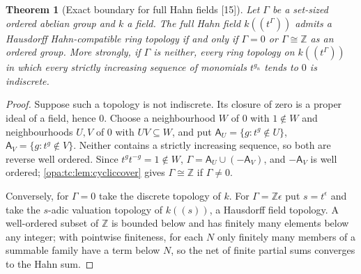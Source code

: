 \documentclass[11pt,oneside]{article}
\numberwithin{equation}{section}
\newtheorem{theorem}{Theorem}[section]
\theoremstyle{definition}
\theoremstyle{remark}
\newcommand{\Z}{\mathbb Z}
\newcommand{\Hahn}[2]{#1((t^{#2}))}
\newcommand{\src}[1]{\textup{\textsf{\small[#1]}}}
\begin{document}
\begin{theorem}[Exact boundary for full Hahn fields \src{15}]\label{opa:tc:thm:cyclicboundary}
Let $\Gamma$ be a set-sized ordered abelian group and $k$ a field. The full Hahn field $\Hahn k\Gamma$
admits a Hausdorff Hahn-compatible ring topology if and only if $\Gamma=0$ or $\Gamma\cong\Z$ as an ordered
group. More strongly, if $\Gamma$ is neither, every ring topology on $\Hahn k\Gamma$ in which every strictly
increasing sequence of monomials $t^{g_n}$ tends to $0$ is indiscrete.
\end{theorem}
\begin{proof}
Suppose such a topology is not indiscrete. Its closure of zero is a proper ideal of a field, hence
$0$. Choose a neighbourhood $W$ of $0$ with $1\notin W$ and neighbourhoods $U,V$ of $0$ with
$UV\subseteq W$, and put $\mathsf A_U=\{g:t^g\notin U\}$, $\mathsf A_V=\{g:t^g\notin V\}$. Neither
contains a strictly increasing sequence, so both are reverse well ordered. Since $t^gt^{-g}=1\notin W$,
$\Gamma=\mathsf A_U\cup(-\mathsf A_V)$, and $-\mathsf A_V$ is well ordered; \cref{opa:tc:lem:cycliccover}
gives $\Gamma\cong\Z$ if $\Gamma\ne0$.

Conversely, for $\Gamma=0$ take the discrete topology of $k$. For $\Gamma=\Z\epsilon$ put $s=t^\epsilon$ and take
the $s$-adic valuation topology of $k((s))$, a Hausdorff field topology. A well-ordered subset of $\Z$ is
bounded below and has finitely many elements below any integer; with pointwise finiteness, for each
$N$ only finitely many members of a summable family have a term below $N$, so the net of finite partial
sums converges to the Hahn sum.
\end{proof}
\end{document}
